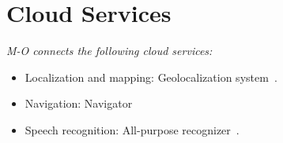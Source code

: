 \section*{Cloud Services}

\textit{M-O connects the following cloud services:}
\begin{itemize}
	\item Localization and mapping: \BnL{} Geolocalization system~\cite{bnl3}.
	\item Navigation: \BnL{} Navigator
	\item Speech recognition: \BnL{} All-purpose recognizer~\cite{bnl1}.
\end{itemize}